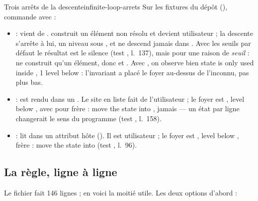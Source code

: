 \begin{exemple}{Trois arrêts de la descente}{infinite-loop-arrets}
Sur les fixtures du dépôt (), commande avec  :
\begin{itemize}
  \item {} :  vient de .  construit un élément non résolu et devient utilisateur ; la descente s'arrête à lui, un niveau sous , et ne descend jamais dans . Avec les seuils par défaut le résultat est le silence (test , l.~137), mais pour une raison de \emph{seuil} :  ne construit qu'un élément, donc  et . Avec , on observe bien \og state  is only used inside , 1 level below \fg{} : l'invariant a placé le foyer au-dessus de l'inconnu, pas plus bas.
  \item {} :  est rendu dans un . Le site en liste fait de  l'utilisateur ; le foyer est ,  level below \fg, avec  pour frère : \Warning{} \og move the state into \fg, jamais  --- un état par ligne changerait le sens du programme (test , l.~158).
  \item {} :  lit  dans un attribut hôte (). Il est utilisateur ; le foyer est ,  level below \fg, frère  : \Warning{} \og move the state into \fg{} (test , l.~96).
\end{itemize}
\end{exemple}

\subsection{La règle, ligne à ligne}

Le fichier fait 146 lignes ; en voici la moitié utile. Les deux options d'abord :


